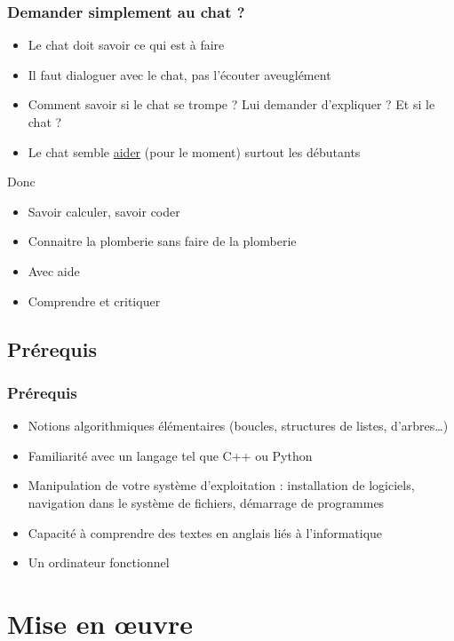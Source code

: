 \documentclass[english, french]{beamer}
\begin{document}
\begin{frame}
	\frametitle{Demander simplement au chat ?}
	\begin{itemize}
		\item Le chat doit savoir ce qui est à faire
		\item Il faut dialoguer avec le chat, pas l’écouter aveuglément
		\item Comment savoir si le chat se trompe ? Lui demander d’expliquer ? Et si le chat  ?
		\item Le chat semble \href{https://www.nber.org/papers/w31161}{aider} {\tiny (pour le moment)} surtout les débutants
	\end{itemize}
  Donc
  \begin{itemize}
		\item Savoir calculer, savoir coder
		\item Connaitre la plomberie sans faire de la plomberie
		\item Avec aide
		\item Comprendre et critiquer
	\end{itemize}
\end{frame}

\subsection{Prérequis}
\begin{frame}
	\frametitle{Prérequis}
	\begin{itemize}
		\item Notions algorithmiques élémentaires (boucles, structures de listes, d’arbres…)
		\item Familiarité avec un langage tel que C++ ou Python
		\item Manipulation de votre système d’exploitation : installation de logiciels, navigation dans le système de fichiers, démarrage de programmes
		\item Capacité à comprendre des textes en anglais liés à l’informatique
		\item Un ordinateur fonctionnel
	\end{itemize}
\end{frame}

\section{Mise en œuvre}
\end{document}
